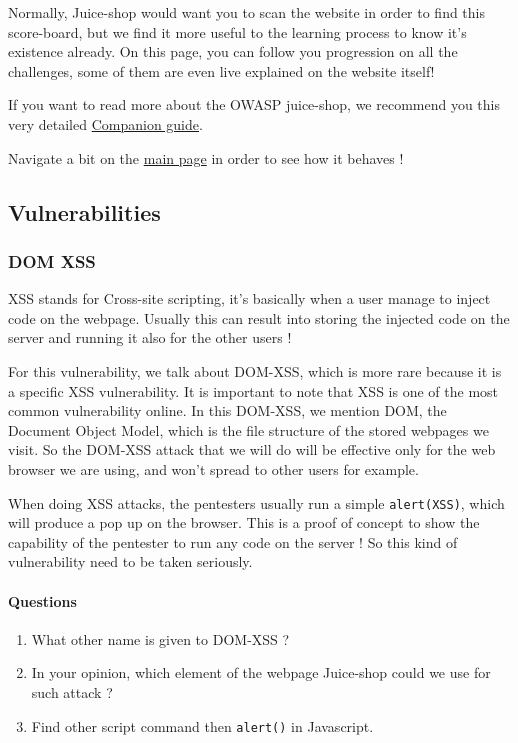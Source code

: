 \documentclass[a4paper,11pt,singlespacing]{article}
\providecommand{\tightlist}{%
  \setlength{\itemsep}{0pt}\setlength{\parskip}{0pt}}
\begin{document}
Normally, Juice-shop would want you to scan the website in order to find
this score-board, but we find it more useful to the learning process to
know it's existence already. On this page, you can follow you
progression on all the challenges, some of them are even live explained
on the website itself!

If you want to read more about the OWASP juice-shop, we recommend you
this very detailed
\href{https://pwning.owasp-juice.shop/companion-guide/latest/}{Companion
guide}.

Navigate a bit on the \href{http://192.168.3.12}{main page} in order to
see how it behaves !

\subsection{Vulnerabilities}\label{vulnerabilities}

\subsubsection{DOM XSS}\label{dom-xss}

XSS stands for Cross-site scripting, it's basically when a user manage
to inject code on the webpage. Usually this can result into storing the
injected code on the server and running it also for the other users !

For this vulnerability, we talk about DOM-XSS, which is more rare
because it is a specific XSS vulnerability. It is important to note that
XSS is one of the most common vulnerability online. In this DOM-XSS, we
mention DOM, the Document Object Model, which is the file structure of
the stored webpages we visit. So the DOM-XSS attack that we will do will
be effective only for the web browser we are using, and won't spread to
other users for example.

When doing XSS attacks, the pentesters usually run a simple
\texttt{alert(\textquotesingle{}XSS\textquotesingle{})}, which will
produce a pop up on the browser. This is a proof of concept to show the
capability of the pentester to run any code on the server ! So this kind
of vulnerability need to be taken seriously.

\paragraph{Questions}\label{questions-3}

\begin{enumerate}
\def\labelenumi{\arabic{enumi}.}
\tightlist
\item
  What other name is given to DOM-XSS ?
\item
  In your opinion, which element of the webpage Juice-shop could we use
  for such attack ?
\item
  Find other script command then \texttt{alert()} in Javascript.
\end{enumerate}
\end{document}
